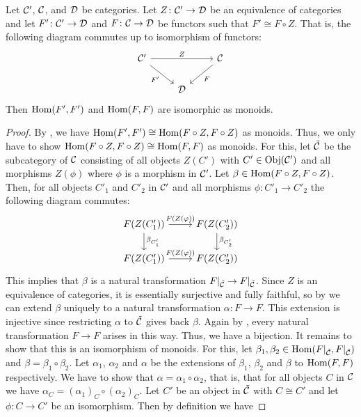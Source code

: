 \begin{prop}\label{prop:generalization_via_equivalence}
Let $\mathcal{C}'$, $\mathcal{C}$, and $\mathcal{D}$ be categories. Let $Z\colon \mathcal{C}' \to \mathcal{D}$ be an equivalence of categories and let $F'\colon \mathcal{C}' \to \mathcal{D}$ and $F\colon \mathcal{C} \to \mathcal{D}$ be functors such that $F' \cong F \circ Z$. That is, the following diagram commutes up to isomorphism of functors:
\[
\begin{tikzcd}
\Ccal' \arrow[rr, "Z"] \arrow[rd, "F'"'] &       & \Ccal \arrow[ld, "F"] \\
                                         & \Dcal &                      
\end{tikzcd}
\]
Then $\operatorname{Hom}(F',F')$ and $\operatorname{Hom}(F,F)$ are isomorphic as monoids.
\end{prop}
\begin{proof}
By , we have $\operatorname{Hom}(F',F') \cong \operatorname{Hom}(F \circ Z,F \circ Z)$ as monoids. Thus, we only have to show $\operatorname{Hom}(F \circ Z,F \circ Z) \cong \operatorname{Hom}(F,F)$ as monoids. For this, let $\tilde {\mathcal{C}}$ be the subcategory of $\mathcal{C}$ consisting of all objects $Z(C')$ with $C' \in \operatorname{Obj}(\mathcal{C}')$ and all morphisms $Z(\phi)$ where $\phi$ is a morphism in $\mathcal{C}'$. Let $\beta \in \operatorname{Hom}(F \circ Z,F \circ Z)$. Then, for all objects $C'_1$ and $C'_2$ in $\mathcal{C}'$ and all morphisms $\phi\colon C'_1 \to C'_2$ the following diagram commutes:
\[
\begin{tikzcd}
F(Z(C'_1)) \arrow[r, "F(Z(\phi))"] \arrow[d, "\beta_{C'_1}"] & F(Z(C'_2)) \arrow[d, "\beta_{C'_2}"] \\
F(Z(C'_1)) \arrow[r, "F(Z(\phi))"]                           & F(Z(C'_2))                         
\end{tikzcd}
\]
This implies that $\beta$ is a natural transformation $F\vert_{\tilde {\mathcal{C}}} \to F\vert_{\tilde {\mathcal{C}}}$. Since $Z$ is an equivalence of categories, it is essentially surjective and fully faithful, so by  we can extend $\beta$ uniquely to a natural transformation $\alpha\colon F \to F$. This extension is injective since restricting $\alpha$ to $\tilde {\mathcal{C}}$ gives back $\beta$. 
Again by , every natural transformation $F \to F$ arises in this way. Thus, we have a bijection. It remains to show that this is an isomorphism of monoids. For this, let $\beta_1, \beta_2 \in \operatorname{Hom}(F\vert_{\tilde {\mathcal{C}}},F\vert_{\tilde {\mathcal{C}}})$ and $\beta = \beta_1 \circ \beta_2$. Let $\alpha_1$, $\alpha_2$ and $\alpha$ be the extensions of $\beta_1$, $\beta_2$ and $\beta$ to $\operatorname{Hom}(F,F)$ respectively. We have to show that $\alpha = \alpha_1 \circ \alpha_2$, that is, that for all objects $C$ in $\mathcal{C}$ we have $\alpha_C = (\alpha_1)_C \circ (\alpha_2)_C$. Let $C'$ be an object in $\tilde {\mathcal{C}}$ with $C \cong C'$ and let $\phi\colon C \to C'$ be an isomorphism. Then by definition we have

\end{proof}
